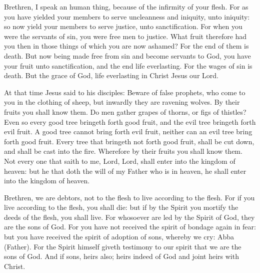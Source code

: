 


Brethren, I speak an human thing, because of the infirmity of your flesh.
For as you have yielded your members to serve uncleanness and iniquity,
unto iniquity: so now yield your members to serve justice, unto
sanctification.
For when you were the servants of sin, you were free men to
justice.
What fruit therefore had you then in those things of which you are
now ashamed? For the end of them is death.
But now being made free from sin and become servants to God, you
have your fruit unto sanctification, and the end life everlasting.
For the wages of sin is death. But the grace of God, life
everlasting in Christ Jesus our Lord.



At that time Jesus said to his disciples:
Beware of false prophets, who come to you in the clothing of
sheep, but inwardly they are ravening wolves.
By their fruits you shall know them. Do men gather grapes of
thorns, or figs of thistles?
Even so every good tree bringeth forth good fruit, and the evil
tree bringeth forth evil fruit.
A good tree cannot bring forth evil fruit, neither can an evil
tree bring forth good fruit.
Every tree that bringeth not forth good fruit, shall be cut down,
and shall be cast into the fire.
Wherefore by their fruits you shall know them.
Not every one that saith to me, Lord, Lord, shall enter into the
kingdom of heaven: but he that doth the will of my Father who is in
heaven, he shall enter into the kingdom of heaven.



\bigskip




Brethren, we are debtors, not to the flesh to live
according to the flesh.
For if you live according to the flesh, you shall die: but if by
the Spirit you mortify the deeds of the flesh, you shall live.
For whosoever are led by the Spirit of God, they are the sons of
God.
For you have not received the spirit of bondage again in fear: but
you have received the spirit of adoption of sons, whereby we cry: Abba
(Father).
For the Spirit himself giveth testimony to our spirit that we are
the sons of God.
And if sons, heirs also; heirs indeed of God and joint heirs with
Christ. %


